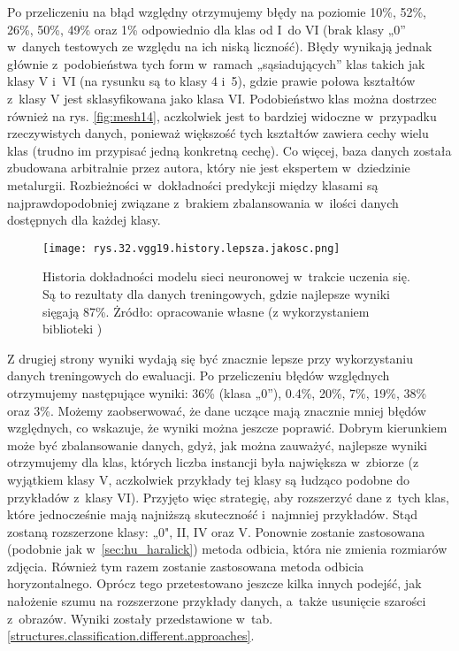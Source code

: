 Po przeliczeniu na błąd względny otrzymujemy błędy na poziomie 10\%, 52\%, 26\%, 50\%, 49\% oraz 1\% odpowiednio dla klas od I~do VI (brak klasy „0” w~danych testowych ze względu na ich niską liczność). Błędy wynikają jednak głównie z~podobieństwa tych form w~ramach „sąsiadujących” klas takich jak klasy V i~VI (na rysunku są to klasy 4 i~5), gdzie prawie połowa kształtów z~klasy V jest sklasyfikowana jako klasa VI. Podobieństwo klas można dostrzec również na rys. \ref{fig:mesh14}, aczkolwiek jest to bardziej widoczne w~przypadku rzeczywistych danych, ponieważ większość tych kształtów zawiera cechy wielu klas (trudno im przypisać jedną konkretną cechę). Co więcej, baza danych została zbudowana arbitralnie przez autora, który nie jest ekspertem w~dziedzinie metalurgii. Rozbieżności w~dokładności predykcji między klasami są najprawdopodobniej związane z~brakiem zbalansowania w~ilości danych dostępnych dla każdej klasy.
\begin{figure}[h]
    \centering
    \texttt{[image: rys.32.vgg19.history.lepsza.jakosc.png]}
    \caption{Historia dokładności modelu sieci neuronowej w~trakcie uczenia się. Są to rezultaty dla danych treningowych, gdzie najlepsze wyniki sięgają 87\%. Żródło: opracowanie własne (z wykorzystaniem biblioteki )}
    \label{fig:mesh30}
\end{figure}
Z drugiej strony wyniki wydają się być znacznie lepsze przy wykorzystaniu danych treningowych do ewaluacji. Po przeliczeniu błędów względnych otrzymujemy następujące wyniki: 36\% (klasa „0”), 0.4\%, 20\%, 7\%, 19\%, 38\% oraz 3\%. Możemy zaobserwować, że dane uczące mają znacznie mniej błędów względnych, co wskazuje, że wyniki można jeszcze poprawić. Dobrym kierunkiem może być zbalansowanie danych, gdyż, jak można zauważyć, najlepsze wyniki otrzymujemy dla klas, których liczba instancji była największa w~zbiorze (z wyjątkiem klasy V, aczkolwiek przykłady tej klasy są łudząco podobne do przykładów z~klasy VI). Przyjęto więc strategię, aby rozszerzyć dane z~tych klas, które jednocześnie mają najniższą skuteczność i~najmniej przykładów. Stąd zostaną rozszerzone klasy: „0", II, IV oraz V. Ponownie zostanie zastosowana (podobnie jak w~\ref{sec:hu_haralick}) metoda odbicia, która nie zmienia rozmiarów zdjęcia. Również tym razem zostanie zastosowana metoda odbicia horyzontalnego. Oprócz tego przetestowano jeszcze kilka innych podejść, jak nałożenie szumu na rozszerzone przykłady danych, a~także usunięcie szarości z~obrazów. Wyniki zostały przedstawione w~tab. \ref{structures.classification.different.approaches}. 
